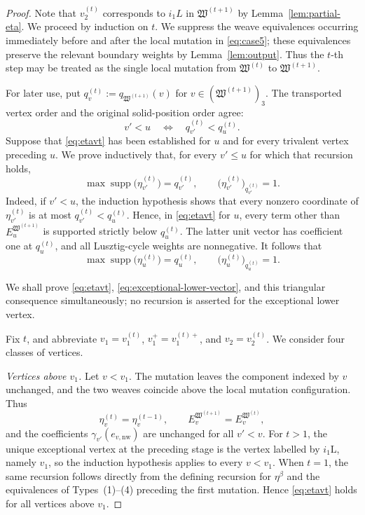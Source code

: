 \documentclass[12pt, reqno]{amsart}
\theoremstyle{plain}
\theoremstyle{definition}
\numberwithin{equation}{section}
\begin{document}
\begin{proof}
Note that $v_2^{(t)}$ corresponds to $i_1L$ in $\mathfrak W^{(t+1)}$ by Lemma~\ref{lem:partial-eta}. We proceed by induction on \(t\). We suppress the weave equivalences
occurring immediately before and after the local mutation in
\eqref{eq:case5}; these equivalences preserve the relevant boundary
weights by Lemma~\ref{lem:output}. Thus the \(t\)-th step may be
treated as the single local mutation from \(\mathfrak W^{(t)}\) to
\(\mathfrak W^{(t+1)}\).

For later use, put
\(
q_v^{(t)}:=q_{\mathfrak W^{(t+1)}}(v)
\)
for \(v\in(\mathfrak W^{(t+1)})_3\). The transported vertex order
and the original solid-position order agree:
\[
   v'<u \quad\Longleftrightarrow\quad
   q_{v'}^{(t)}<q_u^{(t)}.
\]
Suppose that \eqref{eq:etavt} has been established for \(u\) and
for every trivalent vertex preceding \(u\). We prove inductively
that, for every \(v'\leq u\) for which that recursion holds,
\[
    \max\operatorname{supp}\bigl(\eta_{v'}^{(t)}\bigr)
       =q_{v'}^{(t)},
    \qquad
    \bigl(\eta_{v'}^{(t)}\bigr)_{q_{v'}^{(t)}}=1.
\]
Indeed, if \(v'<u\), the induction hypothesis shows that every
nonzero coordinate of \(\eta_{v'}^{(t)}\) is at most
\(q_{v'}^{(t)}<q_u^{(t)}\). Hence, in \eqref{eq:etavt} for \(u\),
every term other than \(E_u^{\mathfrak W^{(t+1)}}\) is supported
strictly below \(q_u^{(t)}\). The latter unit vector has coefficient
one at \(q_u^{(t)}\), and all Lusztig-cycle weights are nonnegative.
It follows that
\begin{equation}\label{eq:leading-coordinate-mutated-eta}
    \max\operatorname{supp}\bigl(\eta_u^{(t)}\bigr)=q_u^{(t)},
    \qquad
    \bigl(\eta_u^{(t)}\bigr)_{q_u^{(t)}}=1.
\end{equation}

We shall prove \eqref{eq:etavt},
\eqref{eq:exceptional-lower-vector}, and this triangular consequence
simultaneously; no recursion is asserted for the exceptional lower
vertex.

Fix \(t\), and abbreviate
\(v_1=v_1^{(t)}\), \(v_1^+=v_1^{(t)+}\), and
\(v_2=v_2^{(t)}\). We consider four classes of vertices.

\smallskip
\noindent
\emph{Vertices above \(v_1\).}
Let \(v<v_1\). The mutation leaves the component indexed by \(v\)
unchanged, and the two weaves coincide above the local mutation
configuration. Thus
\begin{equation}\label{eq:unchanged-data-above-mutation}
    \eta_v^{(t)}=\eta_v^{(t-1)},
    \qquad
    E_v^{\mathfrak W^{(t+1)}}=E_v^{\mathfrak W^{(t)}},
\end{equation}
and the coefficients
\(\gamma_{v'}(e_{v,\mathrm{nw}})\) are unchanged for all \(v'<v\).
For \(t>1\), the unique exceptional vertex at the preceding stage is
the vertex labelled by \(i_1\mathrm L\), namely \(v_1\), so the
induction hypothesis applies to every \(v<v_1\). When \(t=1\), the
same recursion follows directly from the defining recursion for
\(\eta^\beta\) and the equivalences of Types~\textup{(1)}--\textup{(4)}
preceding the first mutation. Hence \eqref{eq:etavt} holds for all
vertices above \(v_1\).


\end{proof}
\end{document}
